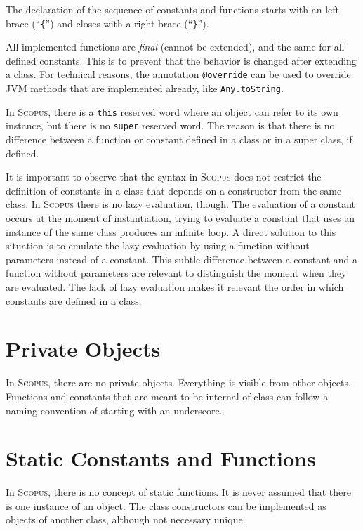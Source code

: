 \documentclass[12pt,a4paper]{book}
\makeatletter
\newcommand{\srccode}[1]{\texttt{{#1}}}
\newcommand{\reservedWord}[1]{{\color{blue}\srccode{#1}}\xspace}
\newcommand{\annotation}[1]{{\color{brown}\srccode{#1}}\xspace}
\newcommand{\sthis}{\reservedWord{this}}
\newcommand{\soverride}{\annotation{@override}}
\newcommand{\Scopus}{\textsc{Scopus}\xspace}
\makeatother
\begin{document}
    The declaration of the sequence of constants and functions starts with an left brace (``\srccode{\{}'') and closes with a right brace (``\srccode{\}}'').

    All implemented functions are \textit{final} (cannot be extended), and the same for all defined constants.
    This is to prevent that the behavior is changed after extending a class.
    For technical reasons, the annotation \soverride can be used to override JVM methods that are implemented already, like \srccode{Any.toString}.

    In \Scopus, there is a \sthis reserved word where an object can refer to its own instance, but there is no \srccode{super} reserved word.
    The reason is that there is no difference between a function or constant defined in a class or in a super class, if defined.

    It is important to observe that the syntax in \Scopus does not restrict the definition of constants in a class that depends on a constructor from the same class.
    In \Scopus there is no lazy evaluation, though.
    The evaluation of a constant occurs at the moment of instantiation, trying to evaluate a constant that uses an instance of the same class produces an infinite loop.
    A direct solution to this situation is to emulate the lazy evaluation by using a function without parameters instead of a constant.
    This subtle difference between a constant and a function without parameters are relevant to distinguish the moment when they are evaluated.
    The lack of lazy evaluation makes it relevant the order in which constants are defined in a class.


    \section{Private Objects}

    In \Scopus, there are no private objects.
    Everything is visible from other objects.
    Functions and constants that are meant to be internal of class can follow a naming convention of starting with an underscore.


    \section{Static Constants and Functions}

    In \Scopus, there is no concept of static functions.
    It is never assumed that there is one instance of an object.
    The class constructors can be implemented as objects of another class, although not necessary unique.
\end{document}
